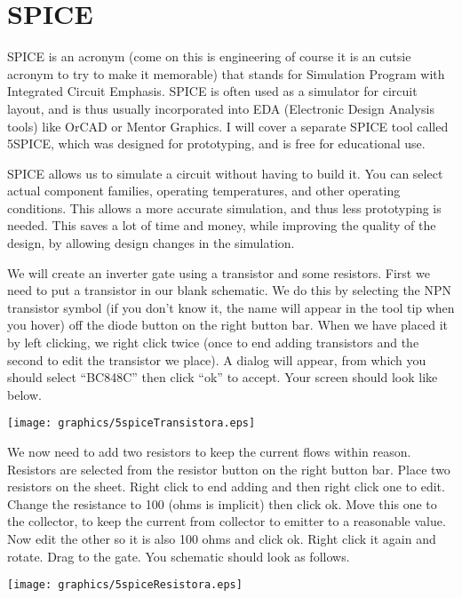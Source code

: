 \chapter{SPICE}

SPICE is an acronym (come on this is engineering of course it is an cutsie acronym to try to make it memorable) that stands for Simulation Program with Integrated Circuit Emphasis.  SPICE is often used as a simulator for circuit layout, and is thus usually incorporated into EDA (Electronic Design Analysis tools) like OrCAD or Mentor Graphics.  I will cover a separate SPICE tool called 5SPICE, which was designed for prototyping, and is free for educational use.

SPICE allows us to simulate a circuit without having to build it.  You can select actual component families, operating temperatures, and other operating conditions.  This allows a more accurate simulation, and thus less prototyping is needed.  This saves a lot of time and money, while improving the quality of the design, by allowing design changes in the simulation.

\raggedbottom\pagebreak
We will create an inverter gate using a transistor and some resistors.  First we need to put a transistor in our blank schematic.  We do this by selecting the NPN transistor symbol (if you don't know it, the name will appear in the tool tip when you hover) off the diode button on the right button bar.  When we have placed it by left clicking, we right click twice (once to end adding transistors and the second to edit the transistor we place).  A dialog will appear, from which you should select ``BC848C'' then click ``ok'' to accept.  Your screen should look like below.

\texttt{[image: graphics/5spiceTransistora.eps]}

\raggedbottom\pagebreak
We now need to add two resistors to keep the current flows within reason.  Resistors are selected from the resistor button on the right button bar.  Place two resistors on the sheet.  Right click to end adding and then right click one to edit.  Change the resistance to 100 (ohms is implicit) then click ok.  Move this one to the collector, to keep the current from collector to emitter to a reasonable value.  Now edit the other so it is also 100 ohms and click ok.  Right click it again and rotate.  Drag to the gate.  You schematic should look as follows.

\texttt{[image: graphics/5spiceResistora.eps]}

